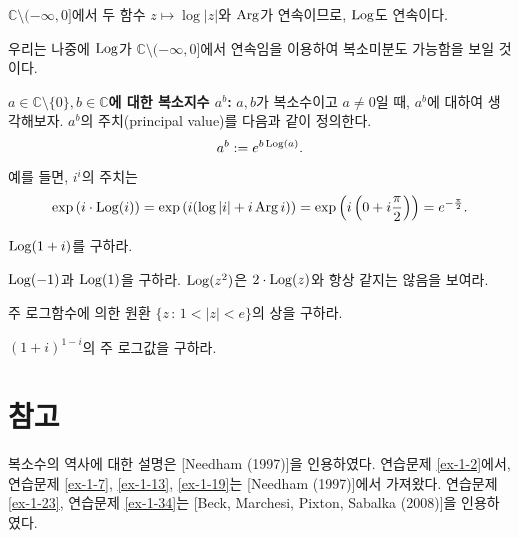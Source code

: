 $\mathbb C \setminus (-\infty,0]$에서 두 함수  $z\mapsto \log |z|$와 $\mathop{\mathrm{Arg}}$가 
연속이므로, $\mathop{\mathrm{Log}}$도 연속이다.

우리는 나중에 $\mathop{\mathrm{Log}}$가 $\mathbb C \setminus (-\infty,0]$에서 연속임을 이용하여
복소미분도 가능함을 보일 것이다.

{\bf $a\in \mathbb C\setminus \{0\}, b\in\mathbb C$에 대한 복소지수 $a^b$: }
$a,b$가 복소수이고 $a\ne0$일 때, $a^b$에 대하여 생각해보자.
$a^b$의 주치(principal value)를 다음과 같이 정의한다.
$$
a^b := e^{b\mathop{\mathrm{Log}}(a)}.
$$
예를 들면, $i^i$의 주치는
$$
\exp\left( i\cdot \mathop{\mathrm{Log}}(i) \right)
= \exp \left( i(\log|i| + i\mathop{\mathrm{Arg}} i) \right)
= \exp \left( i \left(0 + i\frac\pi2\right) \right) 
= e^{-\frac\pi2}.
$$

\begin{salt_exercise}\label{ex-1-40}
$\mathop{\mathrm{Log}} (1+i)$를 구하라.
\end{salt_exercise}

\begin{salt_exercise}\label{ex-1-41}
$\mathop{\mathrm{Log}}(-1)$과 $\mathop{\mathrm{Log}}(1)$을 구하라.
$\mathop{\mathrm{Log}}(z^ 2)$은 $2\cdot \mathop{\mathrm{Log}}(z)$와 항상 같지는 않음을 보여라.
\end{salt_exercise}

\begin{salt_exercise}\label{ex-1-42}
주 로그함수에 의한 원환 $\{ z\,:\, 1 < |z| <e \}$의 상을 구하라.
\end{salt_exercise}

\begin{salt_exercise}\label{ex-1-43}
$(1+i)^{1-i}$의 주 로그값을 구하라.
\end{salt_exercise}

\section{참고}
복소수의 역사에 대한 설명은 [Needham (1997)]을 인용하였다. %
연습문제 \ref{ex-1-2}\는 [Shastri (2000)]에서, 
연습문제 \ref{ex-1-7},  \ref{ex-1-13}, \ref{ex-1-19}는 [Needham (1997)]에서 가져왔다.
연습문제 \ref{ex-1-23}, 연습문제 \ref{ex-1-34}는 [Beck, Marchesi, Pixton, Sabalka (2008)]을 인용하였다.



